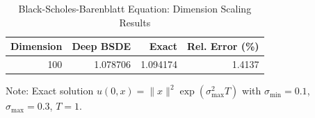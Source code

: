 \begin{table}[htbp]
\centering
\caption{Black-Scholes-Barenblatt Equation: Dimension Scaling Results}
\label{tab:bsb_results}
\begin{tabular}{@{}rrrr@{}}
\toprule
\textbf{Dimension} & \textbf{Deep BSDE} & \textbf{Exact} & \textbf{Rel. Error (\%)} \\
\midrule
100 & 1.078706 & 1.094174 & 1.4137 \\
\bottomrule
\end{tabular}
\begin{tablenotes}
\small
\item Note: Exact solution $u(0, x) = \|x\|^2 \exp(\sigma_{\max}^2 T)$ with $\sigma_{\min} = 0.1$, $\sigma_{\max} = 0.3$, $T = 1$.
\end{tablenotes}
\end{table}

